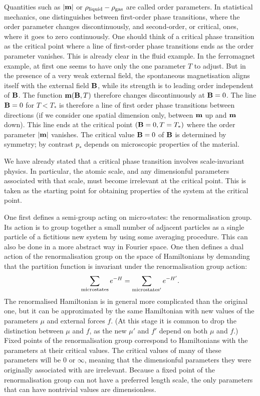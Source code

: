 \documentclass{article}
\begin{document}
Quantities such as $|\bf m|$ or $\rho_{\rm liquid}-\rho_{\rm gas}$ are
called order parameters. In statistical mechanics, one distinguishes
between first-order phase transitions, where the order parameter
changes discontinuously, and second-order, or critical, ones, where it
goes to zero continuously. One should think of a critical phase
transition as the critical point where a line of first-order phase
transitions ends as the order parameter vanishes. This is already
clear in the fluid example. In the ferromagnet example, at first one
seems to have only the one parameter $T$ to adjust. But in the
presence of a very weak external field, the spontaneous magnetisation
aligns itself with the external field ${\bf B}$, while its strength is
to leading order independent of ${\bf B}$. The function ${\bf m}({\bf
B},T)$ therefore changes discontinuously at ${\bf B}=0$. The line
${\bf B}=0$ for $T<T_*$ is therefore a line of first order phase
transitions between directions (if we consider one spatial dimension
only, between ${\bf m}$ up and ${\bf m}$ down). This line ends at the
critical point $({\bf B}=0,T=T_*)$ where the order parameter $|{\bf
m}|$ vanishes. The critical value ${\bf B}=0$ of ${\bf B}$ is determined
by symmetry; by contrast $p_*$ depends on microscopic properties of
the material.

We have already stated that a critical phase transition involves
scale-invariant physics. In particular, the atomic scale, and any
dimensionful parameters associated with that scale, must become
irrelevant at the critical point. This is taken as the starting point
for obtaining properties of the system at the critical point.

One first defines a semi-group acting on micro-states: the
renormalisation group. Its action is to group together a small number
of adjacent particles as a single particle of a fictitious new system
by using some averaging procedure. This can also be done in a more
abstract way in Fourier space. One then defines a dual action of the
renormalisation group on the space of Hamiltonians by demanding that
the partition function is invariant under the renormalisation group
action:
\begin{equation}
\sum_{\rm microstates} e^{-H}=\sum_{\rm microstates'} e^{-H'}. 
\end{equation}
The renormalised Hamiltonian is in general more complicated than the
original one, but it can be approximated by the same Hamiltonian with
new values of the parameters $\mu$ and external forces $f$. (At this
stage it is common to drop the distinction between $\mu$ and $f$, as
the new $\mu'$ and $f'$ depend on both $\mu$ and $f$.) Fixed points of
the renormalisation group correspond to Hamiltonians with the
parameters at their critical values. The critical values
of many of these parameters will be $0$ or $\infty$, meaning that
the dimensionful parameters they were originally associated with
are irrelevant. Because a fixed point of the renormalisation group can
not have a preferred length scale, the only parameters that can have
nontrivial values are dimensionless.
\end{document}
